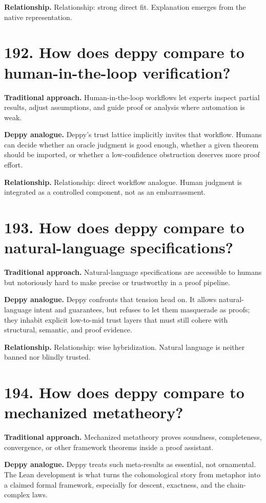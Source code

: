 \documentclass[11pt,openany]{book}
\begin{document}
\textbf{Relationship.} Relationship: strong direct fit. Explanation emerges from the native representation.

\section*{192. How does deppy compare to human-in-the-loop verification?}
\textbf{Traditional approach.} Human-in-the-loop workflows let experts inspect partial results, adjust assumptions, and guide proof or analysis where automation is weak.

\textbf{Deppy analogue.} Deppy's trust lattice implicitly invites that workflow. Humans can decide whether an oracle judgment is good enough, whether a given theorem should be imported, or whether a low-confidence obstruction deserves more proof effort.

\textbf{Relationship.} Relationship: direct workflow analogue. Human judgment is integrated as a controlled component, not as an embarrassment.

\section*{193. How does deppy compare to natural-language specifications?}
\textbf{Traditional approach.} Natural-language specifications are accessible to humans but notoriously hard to make precise or trustworthy in a proof pipeline.

\textbf{Deppy analogue.} Deppy confronts that tension head on. It allows natural-language intent and guarantees, but refuses to let them masquerade as proofs; they inhabit explicit low-to-mid trust layers that must still cohere with structural, semantic, and proof evidence.

\textbf{Relationship.} Relationship: wise hybridization. Natural language is neither banned nor blindly trusted.

\section*{194. How does deppy compare to mechanized metatheory?}
\textbf{Traditional approach.} Mechanized metatheory proves soundness, completeness, convergence, or other framework theorems inside a proof assistant.

\textbf{Deppy analogue.} Deppy treats such meta-results as essential, not ornamental. The Lean development is what turns the cohomological story from metaphor into a claimed formal framework, especially for descent, exactness, and the chain-complex laws.
\end{document}
